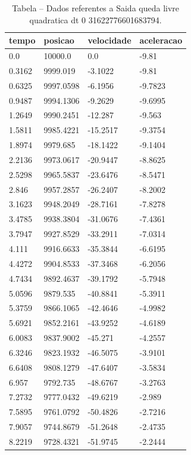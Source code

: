 \begin{table}[H]
\centering
\caption{Tabela – Dados referentes a Saida queda livre quadratica dt 0 31622776601683794.}
\label{tab:saida_queda_livre_quadratica_dt_0_31622776601683794}
\begin{tabular}{llll}
\toprule
tempo & posicao & velocidade & aceleracao \\
\midrule
0.0 & 10000.0 & 0.0 & -9.81 \\
0.3162 & 9999.019 & -3.1022 & -9.81 \\
0.6325 & 9997.0598 & -6.1956 & -9.7823 \\
0.9487 & 9994.1306 & -9.2629 & -9.6995 \\
1.2649 & 9990.2451 & -12.287 & -9.563 \\
1.5811 & 9985.4221 & -15.2517 & -9.3754 \\
1.8974 & 9979.685 & -18.1422 & -9.1404 \\
2.2136 & 9973.0617 & -20.9447 & -8.8625 \\
2.5298 & 9965.5837 & -23.6476 & -8.5471 \\
2.846 & 9957.2857 & -26.2407 & -8.2002 \\
3.1623 & 9948.2049 & -28.7161 & -7.8278 \\
3.4785 & 9938.3804 & -31.0676 & -7.4361 \\
3.7947 & 9927.8529 & -33.2911 & -7.0314 \\
4.111 & 9916.6633 & -35.3844 & -6.6195 \\
4.4272 & 9904.8533 & -37.3468 & -6.2056 \\
4.7434 & 9892.4637 & -39.1792 & -5.7948 \\
5.0596 & 9879.535 & -40.8841 & -5.3911 \\
5.3759 & 9866.1065 & -42.4646 & -4.9982 \\
5.6921 & 9852.2161 & -43.9252 & -4.6189 \\
6.0083 & 9837.9002 & -45.271 & -4.2557 \\
6.3246 & 9823.1932 & -46.5075 & -3.9101 \\
6.6408 & 9808.1279 & -47.6407 & -3.5834 \\
6.957 & 9792.735 & -48.6767 & -3.2763 \\
7.2732 & 9777.0432 & -49.6219 & -2.989 \\
7.5895 & 9761.0792 & -50.4826 & -2.7216 \\
7.9057 & 9744.8679 & -51.2648 & -2.4735 \\
8.2219 & 9728.4321 & -51.9745 & -2.2444 \\

\end{tabular}
\end{table}
